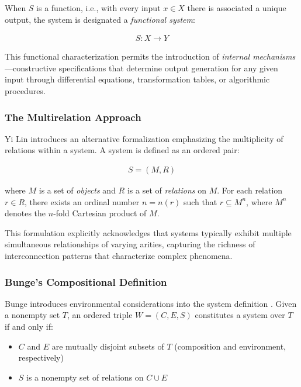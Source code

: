 When $S$ is a function, i.e., with every input $x \in X$ there is associated a unique output, the system is designated a \emph{functional system}:

\begin{align*}
S: X \to Y
\end{align*}

This functional characterization permits the introduction of \emph{internal mechanisms}---constructive specifications that determine output generation for any given input through differential equations, transformation tables, or algorithmic procedures.

\subsubsection{The Multirelation Approach}

Yi Lin \citep{lin1999general} introduces an alternative formalization emphasizing the multiplicity of relations within a system. A system is defined as an ordered pair:

\begin{align*}
S = (M, R)
\end{align*}

where $M$ is a set of \emph{objects} and $R$ is a set of \emph{relations} on $M$. For each relation $r \in R$, there exists an ordinal number $n = n(r)$ such that $r \subseteq M^n$, where $M^n$ denotes the $n$-fold Cartesian product of $M$.

This formulation explicitly acknowledges that systems typically exhibit multiple simultaneous relationships of varying arities, capturing the richness of interconnection patterns that characterize complex phenomena.

\subsubsection{Bunge's Compositional Definition}

Bunge introduces environmental considerations into the system definition \citep{lin1999general}. Given a nonempty set $T$, an ordered triple $W = (C, E, S)$ constitutes a system over $T$ if and only if:

\begin{itemize}
\item $C$ and $E$ are mutually disjoint subsets of $T$ (composition and environment, respectively)
\item $S$ is a nonempty set of relations on $C \cup E$
\end{itemize}


